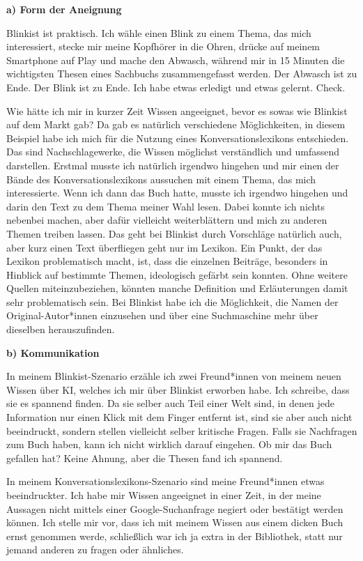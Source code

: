 \documentclass[
  a4paper,
]{book}
\begin{document}
{\textbf{a) Form der Aneignung}}

Blinkist ist praktisch. Ich wähle einen Blink zu einem Thema, das mich interessiert, stecke mir meine Kopfhörer in die Ohren, drücke auf meinem Smartphone auf Play und mache den Abwasch, während mir in 15 Minuten die wichtigsten Thesen eines Sachbuchs zusammengefasst werden. Der Abwasch ist zu Ende. Der Blink ist zu Ende. Ich habe etwas erledigt und etwas gelernt. Check.

Wie hätte ich mir in kurzer Zeit Wissen angeeignet, bevor es sowas wie Blinkist auf dem Markt gab? Da gab es natürlich verschiedene Möglichkeiten, in diesem Beispiel habe ich mich für die Nutzung eines Konversationslexikons entschieden. Das sind Nachschlagewerke, die Wissen möglichst verständlich und umfassend darstellen. Erstmal musste ich natürlich irgendwo hingehen und mir einen der Bände des Konversationslexikons aussuchen mit einem Thema, das mich interessierte. Wenn ich dann das Buch hatte, musste ich irgendwo hingehen und darin den Text zu dem Thema meiner Wahl lesen. Dabei konnte ich nichts nebenbei machen, aber dafür vielleicht weiterblättern und mich zu anderen Themen treiben lassen. Das geht bei Blinkist durch Vorschläge natürlich auch, aber kurz einen Text überfliegen geht nur im Lexikon. Ein Punkt, der das Lexikon problematisch macht, ist, dass die einzelnen Beiträge, besonders in Hinblick auf bestimmte Themen, ideologisch gefärbt sein konnten. Ohne weitere Quellen miteinzubeziehen, könnten manche Definition und Erläuterungen damit sehr problematisch sein. Bei Blinkist habe ich die Möglichkeit, die Namen der Original-Autor*innen einzusehen und über eine Suchmaschine mehr über dieselben herauszufinden.

{\textbf{b) Kommunikation}}

In meinem Blinkist-Szenario erzähle ich zwei Freund*innen von meinem neuen Wissen über KI, welches ich mir über Blinkist erworben habe. Ich schreibe, dass sie es spannend finden. Da sie selber auch Teil einer Welt sind, in denen jede Information nur einen Klick mit dem Finger entfernt ist, sind sie aber auch nicht beeindruckt, sondern stellen vielleicht selber kritische Fragen. Falls sie Nachfragen zum Buch haben, kann ich nicht wirklich darauf eingehen. Ob mir das Buch gefallen hat? Keine Ahnung, aber die Thesen fand ich spannend.

In meinem Konversationslexikons-Szenario sind meine Freund*innen etwas beeindruckter. Ich habe mir Wissen angeeignet in einer Zeit, in der meine Aussagen nicht mittels einer Google-Suchanfrage negiert oder bestätigt werden können. Ich stelle mir vor, dass ich mit meinem Wissen aus einem dicken Buch ernst genommen werde, schließlich war ich ja extra in der Bibliothek, statt nur jemand anderen zu fragen oder ähnliches.
\end{document}
